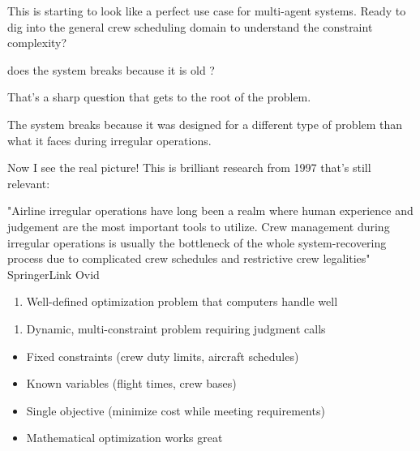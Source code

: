 This is starting to look like a perfect use case for multi-agent systems. Ready to dig into the general crew scheduling domain to understand the constraint complexity?


does the system breaks because it is old ?


That's a sharp question that gets to the root of the problem.


 The system breaks because it was designed for a different type of problem than what it faces during irregular operations.

Now I see the real picture! This is brilliant research from 1997 that's still relevant:

"Airline irregular operations have long been a realm where human experience and judgement are the most important tools to utilize. Crew management during irregular operations is usually the bottleneck of the whole system-recovering process due to complicated crew schedules and restrictive crew legalities" 
SpringerLink
Ovid



\begin{enumerate}
\item {} Well-defined optimization problem that computers handle well
\end{enumerate}
\begin{enumerate}
\item {} Dynamic, multi-constraint problem requiring judgment calls
\end{enumerate}



\begin{itemize}
\item Fixed constraints (crew duty limits, aircraft schedules)
\end{itemize}
\begin{itemize}
\item Known variables (flight times, crew bases)
\end{itemize}
\begin{itemize}
\item Single objective (minimize cost while meeting requirements)
\end{itemize}
\begin{itemize}
\item Mathematical optimization works great
\end{itemize}


